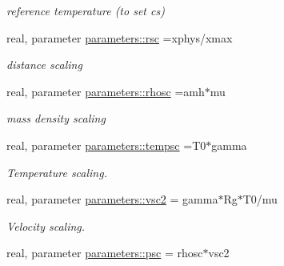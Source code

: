 \begin{DoxyCompactItemize}
\begin{DoxyCompactList}\small\item\em reference temperature (to set cs) \end{DoxyCompactList}\item 
\hypertarget{namespaceparameters_aae00fb44c9445b75ac9e9fe1a3836668}{}real, parameter \hyperlink{namespaceparameters_aae00fb44c9445b75ac9e9fe1a3836668}{parameters\+::rsc} =xphys/xmax\label{namespaceparameters_aae00fb44c9445b75ac9e9fe1a3836668}

\begin{DoxyCompactList}\small\item\em distance scaling \end{DoxyCompactList}\item 
\hypertarget{namespaceparameters_a0e7200e85023d763950f5d027c265b47}{}real, parameter \hyperlink{namespaceparameters_a0e7200e85023d763950f5d027c265b47}{parameters\+::rhosc} =amh$\ast$mu\label{namespaceparameters_a0e7200e85023d763950f5d027c265b47}

\begin{DoxyCompactList}\small\item\em mass density scaling \end{DoxyCompactList}\item 
\hypertarget{namespaceparameters_aeb110c6e84304ed31d7e4a4f86fa07c0}{}real, parameter \hyperlink{namespaceparameters_aeb110c6e84304ed31d7e4a4f86fa07c0}{parameters\+::tempsc} =T0$\ast$gamma\label{namespaceparameters_aeb110c6e84304ed31d7e4a4f86fa07c0}

\begin{DoxyCompactList}\small\item\em Temperature scaling. \end{DoxyCompactList}\item 
\hypertarget{namespaceparameters_a09f3a853f8927374a15bc5b14395e397}{}real, parameter \hyperlink{namespaceparameters_a09f3a853f8927374a15bc5b14395e397}{parameters\+::vsc2} = gamma$\ast$Rg$\ast$T0/mu\label{namespaceparameters_a09f3a853f8927374a15bc5b14395e397}

\begin{DoxyCompactList}\small\item\em Velocity scaling. \end{DoxyCompactList}\item 
\hypertarget{namespaceparameters_a95ee496fdf29b48b5e990f029331ea9e}{}real, parameter \hyperlink{namespaceparameters_a95ee496fdf29b48b5e990f029331ea9e}{parameters\+::psc} = rhosc$\ast$vsc2\label{namespaceparameters_a95ee496fdf29b48b5e990f029331ea9e}


\end{DoxyCompactItemize}
